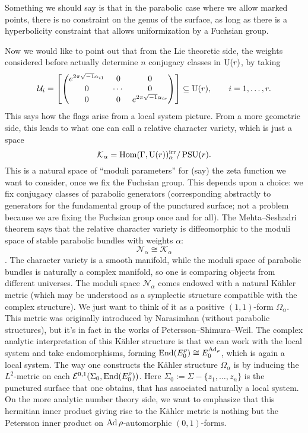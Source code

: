 \documentclass[reqno]{amsart} 
\numberwithin{theorem}{section}
\numberwithin{equation}{section}
\begin{document}
Something we should say is that in the parabolic case where we allow marked points, there is no constraint on the genus of the surface, as long as there is a hyperbolicity constraint that allows uniformization by a Fuchsian group.

Now we would like to point out that from the Lie theoretic side, the weights considered before actually determine $n$ conjugacy classes in $\operatorname{U}(r)$, by taking
\begin{equation*}
  \mathcal{U}_i = \left[
    \begin{pmatrix}
      e^{2 \pi \sqrt{-1} \alpha_{i 1}}      & 0 & 0 \\
      0 & \dotsb & 0 \\
      0 & 0 & e^{2 \pi \sqrt{- 1} \alpha_{i r}} \\
    \end{pmatrix} \right]
  \subseteq \operatorname{U}(r), \qquad
  i = 1, \dotsc, r.
\end{equation*}
This says how the flags arise from a local system picture.  From a more geometric side, this leads to what one can call a relative character variety, which is just a space
\begin{equation*}
  \mathcal{K}_\alpha = \operatorname{Hom}(\Gamma, \operatorname{U}(r))_\alpha^{\mathrm{irr}} / \operatorname{PSU}(r).
\end{equation*}
This is a natural space of ``moduli parameters'' for (say) the zeta function we want to consider, once we fix the Fuchsian group.  This depends upon a choice: we fix conjugacy classes of parabolic generators (corresponding abstractly to generators for the fundamental group of the punctured surface; not a problem because we are fixing the Fuchsian group once and for all).  The Mehta--Seshadri theorem says that the relative character variety is diffeomorphic to the moduli space of stable parabolic bundles with weights $\alpha$:
\begin{equation*}
  \mathcal{N}_\alpha \cong \mathcal{K}_\alpha
\end{equation*}.
The character variety is a smooth manifold, while the moduli space of parabolic bundles is naturally a complex manifold, so one is comparing objects from different universes.  The moduli space $\mathcal{N}_\alpha$ comes endowed with a natural K\"{a}hler metric (which may be understood as a symplectic structure compatible with the complex structure).  We just want to think of it as a positive $(1, 1)$-form $\Omega_\alpha$.  This metric was originally introduced by Narasimhan (without parabolic structures), but it's in fact in the works of Petersson--Shimura--Weil.  The complex analytic interpretation of this K\"{a}hler structure is that we can work with the local system and take endomorphisms, forming $\operatorname{End}(E_0^\rho) \cong E_0^{\operatorname{Ad}_\rho}$, which is again a local system.  The way one constructs the K\"{a}hler structure $\Omega_\alpha$ is by inducing the $L^2$-metric on each $\mathcal{E}^{0, 1}(\Sigma_0, \operatorname{End}(E_0^\rho))$.  Here $\Sigma_0 := \Sigma - \{z_1, \dotsc, z_n\}$ is the punctured surface that one obtains, that has associated naturally a local system.  On the more analytic number theory side, we want to emphasize that this hermitian inner product giving rise to the K\"{a}hler metric is nothing but the Petersson inner product on $\operatorname{Ad} \rho$-automorphic $(0, 1)$-forms.
\end{document}
